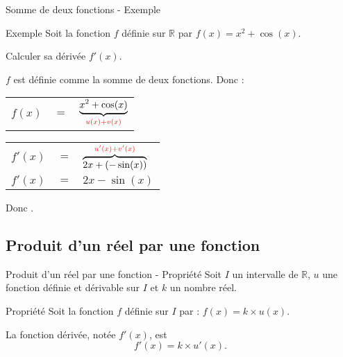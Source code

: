 \documentclass[12pt]{beamer}
\begin{document}
\begin{frame}{Somme de deux fonctions - Exemple}
\begin{block}{Exemple}
Soit la fonction $f$ définie sur $\mathbb{R}$ par $f(x) = x^2 + \cos(x)$. \par 
Calculer sa dérivée $f'(x)$.
\end{block}

\medskip

$f$ est définie comme la somme de deux fonctions. Donc :

\medskip

\begin{tabular}{rcl}
$f(x)$ & $=$ & $\underbrace{x^2 + \cos(x)}_{\textcolor{red}{u(x) + v(x)}}$ \\
\end{tabular}

\medskip

\begin{tabular}{rcl}
$f'(x)$ & $=$ & $\overbrace{2x + (-\sin(x))}^{\textcolor{red}{u'(x) + v'(x)}}$ \\
$f'(x)$ & $=$ & $2x -\sin(x)$
\end{tabular}

\medskip

Donc .

\end{frame}


\subsection{Produit d'un réel par une fonction}

\begin{frame}{Produit d'un réel par une fonction - Propriété}
Soit $I$ un intervalle de $\mathbb{R}$, $u$ une fonction définie et dérivable sur $I$ et $k$ un nombre réel. 

\medskip

\begin{exampleblock}{Propriété}
Soit la fonction $f$ définie sur $I$ par : $f(x) = k \times u(x)$. \par 
La fonction dérivée, notée $f'(x)$, est \[ f'(x) = k \times u'(x). \]
\end{exampleblock}
\end{frame}
\end{document}
